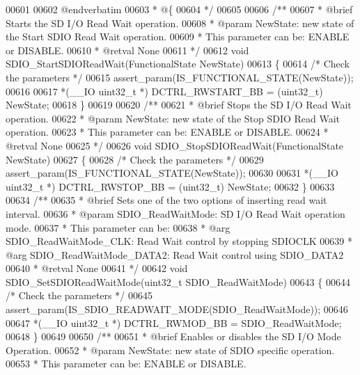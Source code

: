 \begin{DoxyCode}
00601 \textcolor{comment}{}
00602 \textcolor{comment}{@endverbatim}
00603 \textcolor{comment}{  * @\{}
00604 \textcolor{comment}{  */}
00605 
00606 \textcolor{comment}{/**}
00607 \textcolor{comment}{  * @brief  Starts the SD I/O Read Wait operation.  }
00608 \textcolor{comment}{  * @param  NewState: new state of the Start SDIO Read Wait operation. }
00609 \textcolor{comment}{  *         This parameter can be: ENABLE or DISABLE.}
00610 \textcolor{comment}{  * @retval None}
00611 \textcolor{comment}{  */}
00612 \textcolor{keywordtype}{void} SDIO_StartSDIOReadWait(FunctionalState NewState)
00613 \{
00614   \textcolor{comment}{/* Check the parameters */}
00615   assert_param(IS\_FUNCTIONAL\_STATE(NewState));
00616 
00617   *(\_\_IO uint32\_t *) DCTRL_RWSTART_BB = (uint32\_t) NewState;
00618 \}
00619 
00620 \textcolor{comment}{/**}
00621 \textcolor{comment}{  * @brief  Stops the SD I/O Read Wait operation.   }
00622 \textcolor{comment}{  * @param  NewState: new state of the Stop SDIO Read Wait operation. }
00623 \textcolor{comment}{  *         This parameter can be: ENABLE or DISABLE.}
00624 \textcolor{comment}{  * @retval None}
00625 \textcolor{comment}{  */}
00626 \textcolor{keywordtype}{void} SDIO_StopSDIOReadWait(FunctionalState NewState)
00627 \{
00628   \textcolor{comment}{/* Check the parameters */}
00629   assert_param(IS\_FUNCTIONAL\_STATE(NewState));
00630 
00631   *(\_\_IO uint32\_t *) DCTRL_RWSTOP_BB = (uint32\_t) NewState;
00632 \}
00633 
00634 \textcolor{comment}{/**}
00635 \textcolor{comment}{  * @brief  Sets one of the two options of inserting read wait interval.}
00636 \textcolor{comment}{  * @param  SDIO\_ReadWaitMode: SD I/O Read Wait operation mode.}
00637 \textcolor{comment}{  *          This parameter can be:}
00638 \textcolor{comment}{  *            @arg SDIO\_ReadWaitMode\_CLK: Read Wait control by stopping SDIOCLK}
00639 \textcolor{comment}{  *            @arg SDIO\_ReadWaitMode\_DATA2: Read Wait control using SDIO\_DATA2}
00640 \textcolor{comment}{  * @retval None}
00641 \textcolor{comment}{  */}
00642 \textcolor{keywordtype}{void} SDIO_SetSDIOReadWaitMode(uint32\_t SDIO\_ReadWaitMode)
00643 \{
00644   \textcolor{comment}{/* Check the parameters */}
00645   assert_param(IS\_SDIO\_READWAIT\_MODE(SDIO\_ReadWaitMode));
00646 
00647   *(\_\_IO uint32\_t *) DCTRL_RWMOD_BB = SDIO\_ReadWaitMode;
00648 \}
00649 
00650 \textcolor{comment}{/**}
00651 \textcolor{comment}{  * @brief  Enables or disables the SD I/O Mode Operation.}
00652 \textcolor{comment}{  * @param  NewState: new state of SDIO specific operation. }
00653 \textcolor{comment}{  *         This parameter can be: ENABLE or DISABLE.}

\end{DoxyCode}
